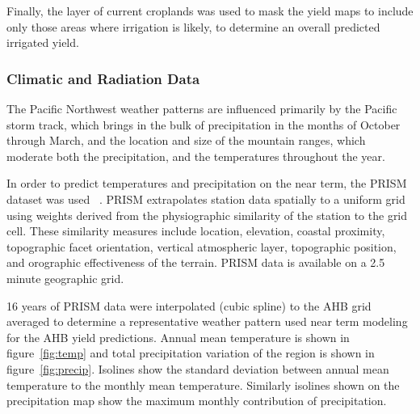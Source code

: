 \documentclass[preprint,12pt]{elsarticle}
\begin{document}
Finally, the layer of current croplands was used to mask the yield
maps to include only those areas where irrigation is likely, to
determine an overall predicted irrigated yield.

\subsubsection{Climatic and Radiation Data}
\label{sec:climate}


The Pacific Northwest weather patterns are influenced primarily by the
Pacific storm track, which brings in the bulk of precipitation in the
months of October through March, and the location and size of the
mountain ranges, which moderate both the precipitation, and the
temperatures throughout the year.

In order to predict temperatures and precipitation on the near term,
the \acf{PRISM} dataset was used ~\cite{Daly2008}.  \ac{PRISM}
extrapolates station data spatially to a uniform grid using weights
derived from the physiographic similarity of the station to the grid
cell. These similarity measures include location, elevation, coastal
proximity, topographic facet orientation, vertical atmospheric layer,
topographic position, and orographic effectiveness of the terrain.
\ac{PRISM} data is available on a 2.5 minute geographic grid.

16 years of \ac{PRISM} data were interpolated (cubic spline) to the
\ac{AHB} grid averaged to determine a representative weather pattern
used near term modeling for the \ac{AHB} yield predictions.
Annual mean temperature is shown in figure~\ref{fig:temp} and total
precipitation variation of the region is shown in figure~\ref{fig:precip}.  Isolines show the standard
deviation between annual mean temperature to the monthly mean
temperature.  Similarly isolines shown on the precipitation map show
the maximum monthly contribution of precipitation.
\end{document}
